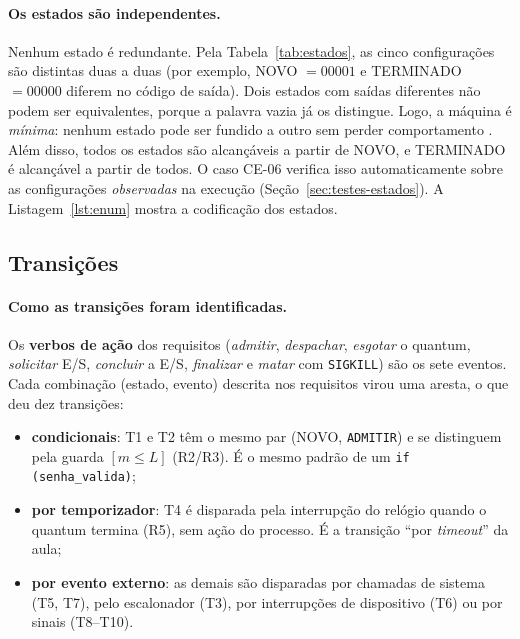 \documentclass[11pt,a4paper]{article}
\theoremstyle{definition}
\newcommand{\est}[1]{\textsf{\small #1}}   %
\newcommand{\ev}[1]{\texttt{\small #1}}    %
\begin{document}
\paragraph{Os estados são independentes.} Nenhum estado é redundante. Pela Tabela~\ref{tab:estados},
as cinco configurações são distintas duas a duas (por exemplo, \est{NOVO} $= 00001$ e
\est{TERMINADO} $= 00000$ diferem no código de saída). Dois estados com saídas diferentes não podem
ser equivalentes, porque a palavra vazia já os distingue. Logo, a máquina é \emph{mínima}: nenhum
estado pode ser fundido a outro sem perder comportamento \cite{hopcroft}. Além disso, todos os
estados são alcançáveis a partir de \est{NOVO}, e \est{TERMINADO} é alcançável a partir de todos. O
caso CE-06 verifica isso automaticamente sobre as configurações \emph{observadas} na execução
(Seção~\ref{sec:testes-estados}). A Listagem~\ref{lst:enum} mostra a codificação dos estados.



\subsection{Transições}\label{sec:transicoes}

\paragraph{Como as transições foram identificadas.} Os \textbf{verbos de ação} dos requisitos
(\emph{admitir}, \emph{despachar}, \emph{esgotar} o quantum, \emph{solicitar} E/S, \emph{concluir}
a E/S, \emph{finalizar} e \emph{matar} com \texttt{SIGKILL}) são os sete eventos. Cada combinação
(estado, evento) descrita nos requisitos virou uma aresta, o que deu dez transições:
\begin{itemize}
  \item \textbf{condicionais}: T1 e T2 têm o mesmo par (\est{NOVO}, \ev{ADMITIR}) e se distinguem
        pela guarda $[m \le L]$ (R2/R3). É o mesmo padrão de um \texttt{if (senha\_valida)};
  \item \textbf{por temporizador}: T4 é disparada pela interrupção do relógio quando o quantum
        termina (R5), sem ação do processo. É a transição ``por \emph{timeout}'' da aula;
  \item \textbf{por evento externo}: as demais são disparadas por chamadas de sistema (T5, T7),
        pelo escalonador (T3), por interrupções de dispositivo (T6) ou por sinais (T8--T10).
\end{itemize}
\end{document}
